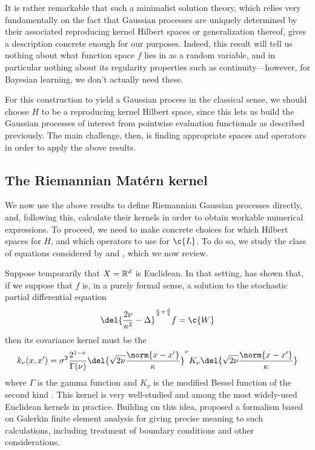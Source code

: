 \documentclass[11pt]{book}
\begin{document}
It is rather remarkable that such a minimalist solution theory, which relies very fundamentally on the fact that Gaussian processes are uniquely determined by their associated reproducing kernel Hilbert spaces or generalization thereof, gives a description concrete enough for our purposes.
Indeed, this result will tell us nothing about what function space $f$ lies in as a random variable, and in particular nothing about its regularity properties such as continuity---however, for Bayesian learning, we don't actually need these.

For this construction to yield a Gaussian process in the classical sense, we should choose $H$ to be a reproducing kernel Hilbert space, since this lets us build the Gaussian processes of interest from pointwise evaluation functionals as described previously.
The main challenge, then, is finding appropriate spaces and operators in order to apply the above results.

\subsection{The Riemannian Matérn kernel}

We now use the above results to define Riemannian Gaussian processes directly, and, following this, calculate their kernels in order to obtain workable numerical expressions.
To proceed, we need to make concrete choices for which Hilbert spaces for $H$, and which operators to use for $\c{L}$.
To do so, we study the class of equations considered by \textcite{whittle63} and \textcite{lindgren11}, which we now review.

Suppose temporarily that $X = \mathbb{R}^d$ is Euclidean.
In that setting, \textcite{whittle63} has shown that, if we suppose that $f$ is, in a purely formal sense, a solution to the stochastic partial differential equation
\[
\del{\frac{2\nu}{\kappa^2} - \lap}^{\frac{\nu}{2} + \frac{d}{4}} f = \c{W}
\]
then its covariance kernel must be the 
\[
k_{\nu}(x,x') = \sigma^2 \frac{2^{1-\nu}}{\Gamma(\nu)} \del{\sqrt{2\nu} \frac{\norm{x-x'}}{\kappa}}^\nu K_\nu \del{\sqrt{2\nu} \frac{\norm{x-x'}}{\kappa}}
\]
where $\Gamma$ is the gamma function and $K_\nu$ is the modified Bessel function of the second kind \cite{gradshteyn14}.
This kernel is very well-studied and among the most widely-used Euclidean kernels in practice.
Building on this idea, \textcite{lindgren11} proposed a formalism based on Galerkin finite element analysis for giving precise meaning to such calculations, including treatment of boundary conditions and other considerations.
\end{document}
